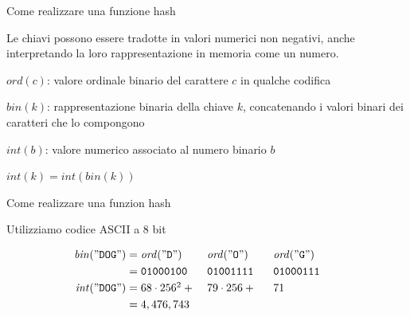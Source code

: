 \begin{frame}{Come realizzare una funzione hash}

\vspace{-6pt}
\begin{myboxtitle}[Assunzione]
Le chiavi possono essere tradotte in valori numerici non negativi, anche
interpretando la loro rappresentazione in memoria come un numero.
\end{myboxtitle}

\begin{myboxtitle}
\BI
\item $\mathit{ord}(c)$: valore ordinale binario del carattere $c$ in qualche codifica
\item $\mathit{bin}(k)$:	rappresentazione binaria della chiave $k$, concatenando i valori binari 
  dei caratteri che lo compongono
\item $\mathit{int}(b)$: valore numerico associato al numero binario $b$
\item $\mathit{int}(k) = \mathit{int}(\mathit{bin}(k))$
\EI
\end{myboxtitle}


\end{frame}

\begin{frame}{Come realizzare una funzion hash}

\vspace{-6pt}
\BIL
\item Utilizziamo codice ASCII a 8 bit
\EIL

\begin{align*}
\mathit{bin}("\texttt{DOG}") &= \makebox[2.1cm][l]{$\mathit{ord}("\mathtt{D}")$} \makebox[2.1cm][l]{$\mathit{ord}("\mathtt{O}")$} \makebox[2.1cm][l]{$\mathit{ord}("\mathtt{G}"$)} \\
	&= \makebox[2.1cm][l]{\texttt{01000100}} \makebox[2.1cm][l]{\texttt{01001111}} \makebox[2.1cm][l]{\texttt{01000111}} \\
\mathit{int}("\texttt{DOG}") &= \makebox[2.1cm][l]{$68 \cdot 256^2 + {}$} \makebox[2.1cm][l]{$79 \cdot 256 + {}$} \makebox[2.1cm][l]{$71$} \\
	&= 4,476,743
\end{align*}

\end{frame}

